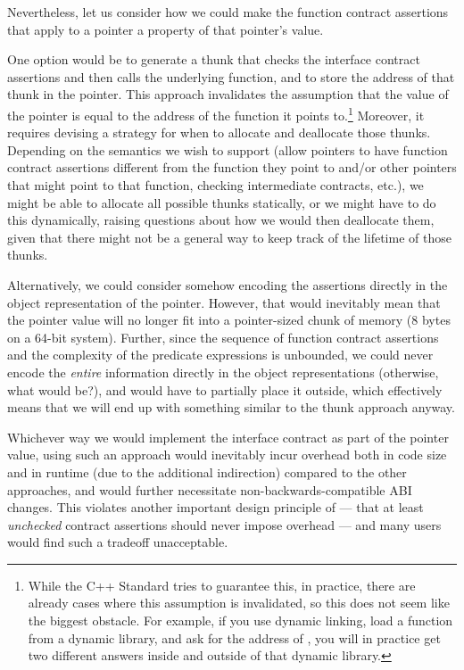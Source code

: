 Nevertheless, let us consider how we could make the function contract assertions that apply to a pointer a property of that pointer's value.

One option would be to generate a thunk that checks the interface contract assertions and then calls the underlying function, and to store the address of that thunk in the pointer. This approach  invalidates the assumption that the value of the pointer is equal to the address of the function it points to.\footnote{While the C++ Standard tries to guarantee this, in practice, there are already cases where this assumption is invalidated, so this does not seem like the biggest obstacle. For example, if you use dynamic linking, load a function  from a dynamic library, and ask for the address of , you will in practice get two different answers inside and outside of that dynamic library.} Moreover, it requires devising a strategy for when to allocate and deallocate those thunks. Depending on the semantics we wish to support (allow pointers to have function contract assertions different from the function they point to and/or other pointers that might point to that function, checking intermediate contracts, etc.), we might be able to allocate all possible thunks statically, or we might have to do this dynamically, raising questions about how we would then deallocate them, given that there might not be a general way to keep track of the lifetime of those thunks.

Alternatively, we could consider somehow encoding the assertions directly in the object representation of the pointer. However, that would inevitably mean that the pointer value will no longer fit into a pointer-sized chunk of memory (8 bytes on a 64-bit system). Further, since the sequence of function contract assertions and the complexity of the predicate expressions is unbounded, we could never encode the \emph{entire} information directly in the object representations (otherwise, what would  be?), and would have to partially place it outside, which effectively means that we will end up with something similar to the thunk approach anyway.

Whichever way we would implement the interface contract as part of the pointer value, using such an approach would inevitably incur overhead both in code size and in runtime (due to the additional indirection) compared to the other approaches, and would further necessitate non-backwards-compatible ABI changes. This violates another important design principle of \cite{P2900R7} --- that at least \emph{unchecked} contract assertions should never impose overhead --- and many users would find such a tradeoff unacceptable.

